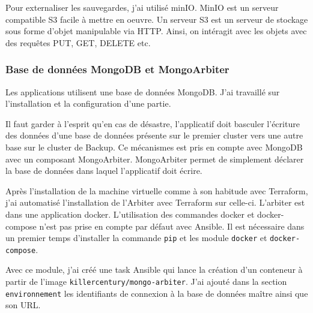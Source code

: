 \documentclass[12pt, a4paper, twoside]{article}
\begin{document}
Pour externaliser les sauvegardes, j'ai utilisé minIO.
MinIO est un serveur compatible S3 facile à mettre en oeuvre.
Un serveur S3 est un serveur de stockage sous forme d'objet manipulable via HTTP.
Ainsi, on intéragit avec les objets avec des requêtes PUT, GET, DELETE etc.

\subsubsection{Base de données MongoDB et MongoArbiter}
Les applications utilisent une base de données MongoDB.
J'ai travaillé sur l'installation et la configuration d'une partie.

Il faut garder à l'esprit qu'en cas de désastre, l'applicatif doit basculer l'écriture des données d'une base de données présente sur le premier \gls{cluster} vers une autre base sur le \gls{cluster} de Backup.
Ce mécanismes est pris en compte avec MongoDB avec un composant MongoArbiter.
MongoArbiter permet de simplement déclarer la base de données dans laquel l'applicatif doit écrire.

Après l'installation de la machine virtuelle comme à son habitude avec \gls{Terraform}, j'ai automatisé l'installation de l'Arbiter avec \gls{Terraform} sur celle-ci.
L'arbiter est dans une application docker.
L'utilisation des commandes docker et docker-compose n'est pas prise en compte par défaut avec \gls{Ansible}.
Il est nécessaire dans un premier temps d'installer la commande \verb|pip| et les module \verb|docker| et \verb|docker-compose|.

Avec ce module, j'ai créé une task \gls{Ansible} qui lance la création d'un conteneur à partir de l'image \verb|killercentury/mongo-arbiter|.
J'ai ajouté dans la section \verb|environnement| les identifiants de connexion à la base de données maître ainsi que son URL.

\newpage
\end{document}
